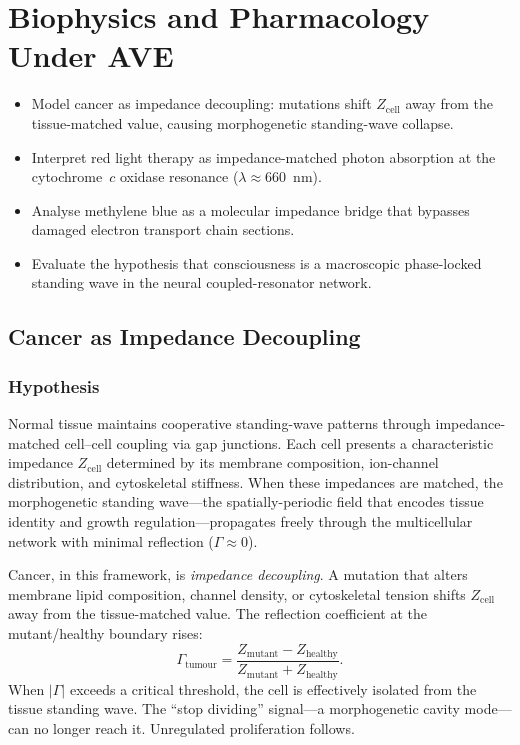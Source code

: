 \chapter{Biophysics and Pharmacology Under AVE}
\label{ch:biophysics_pharmacology}


\begin{objectivebox}
\begin{itemize}
    \item Model cancer as impedance decoupling: mutations shift $Z_{\text{cell}}$ away from the tissue-matched value, causing morphogenetic standing-wave collapse.
    \item Interpret red light therapy as impedance-matched photon absorption at the cytochrome~$c$ oxidase resonance ($\lambda \approx 660$~nm).
    \item Analyse methylene blue as a molecular impedance bridge that bypasses damaged electron transport chain sections.
    \item Evaluate the hypothesis that consciousness is a macroscopic phase-locked standing wave in the neural coupled-resonator network.
\end{itemize}
\end{objectivebox}

\section{Cancer as Impedance Decoupling}
\label{sec:cancer_impedance}

\subsection{Hypothesis}

Normal tissue maintains cooperative standing-wave patterns through
impedance-matched cell--cell coupling via gap junctions.  Each cell
presents a characteristic impedance $Z_{\mathrm{cell}}$ determined
by its membrane composition, ion-channel distribution, and
cytoskeletal stiffness.  When these impedances are matched, the
morphogenetic standing wave---the spatially-periodic field that
encodes tissue identity and growth regulation---propagates freely
through the multicellular network with minimal reflection
($\Gamma \approx 0$).

Cancer, in this framework, is \emph{impedance decoupling}.  A
mutation that alters membrane lipid composition, channel density,
or cytoskeletal tension shifts $Z_{\mathrm{cell}}$ away from the
tissue-matched value.  The reflection coefficient at the
mutant/healthy boundary rises:
\begin{equation}
  \Gamma_{\mathrm{tumour}} 
  = \frac{Z_{\mathrm{mutant}} - Z_{\mathrm{healthy}}}
         {Z_{\mathrm{mutant}} + Z_{\mathrm{healthy}}}.
\end{equation}
When $|\Gamma|$ exceeds a critical threshold, the cell is
effectively isolated from the tissue standing wave.  The ``stop
dividing'' signal---a morphogenetic cavity mode---can no longer
reach it.  Unregulated proliferation follows.

